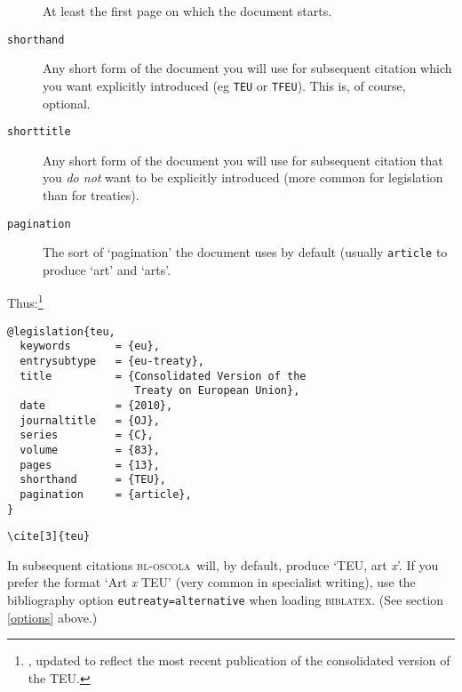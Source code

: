 \documentclass[a5paper,fontsize=9pt,DIV=1]{scrartcl}
\newcommand{\oscola}{\textsc{bl-oscola}}
\newcommand{\biblatex}{\textsc{biblatex}}
\newcounter{egcounter}\setcounter{egcounter}{0}
\newenvironment{bibexample}[1][]{%
  \medskip\par\small\noindent\ignorespaces
  \marginpar{[\refstepcounter{egcounter}\arabic{egcounter}]\label{#1}}
  \begin{minipage}[t]{0.95\linewidth}}
 {\end{minipage}\par\medskip}
\newcommand{\egcite}[1]{\texttt{\textbackslash cite#1}}
\begin{document}
\begin{description}
 At least the first page on which the document starts.
\item[\texttt{shorthand}]
Any short form of the document you will use
  for subsequent citation which you want explicitly introduced (eg
  \texttt{TEU} or \texttt{TFEU}). This is, of course, optional.
\item[\texttt{shorttitle}]
Any short form of the document you will use
  for subsequent citation that you \emph{do not} want to be explicitly
  introduced (more common for legislation than for treaties).
\item[\texttt{pagination}]
 The sort of `pagination' the document uses
  by default (usually \texttt{article} to produce `art' and `arts'.
\end{description}

Thus:\footnote{\cite[29]{oscola}, updated to reflect the most recent
  publication of the consolidated version of the TEU.}
\begin{bibexample}[teu]
\begin{verbatim}
@legislation{teu,
  keywords       = {eu},
  entrysubtype   = {eu-treaty},
  title          = {Consolidated Version of the 
                    Treaty on European Union},
  date           = {2010},
  journaltitle   = {OJ},
  series         = {C},
  volume         = {83},
  pages          = {13},
  shorthand      = {TEU},
  pagination     = {article},
}
\end{verbatim}
\end{bibexample}

\begin{description}
\item[\egcite{[3]\{teu\}}] \cite[3]{teu}
\end{description}

In subsequent citations \oscola\ will, by default, produce `TEU, art
\emph{x}'. If you prefer the format `Art \emph{x} TEU' (very common in
specialist writing), use the bibliography option
\texttt{eutreaty={}alternative} when loading \biblatex. (See section
\ref{options} above.)
\end{document}
